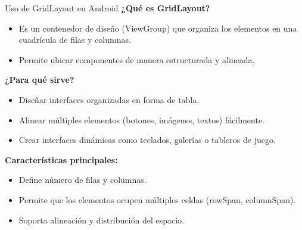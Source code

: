 \begin{frame}{Uso de GridLayout en Android}
\textbf{¿Qué es GridLayout?}

\begin{itemize}
    \item Es un contenedor de diseño (ViewGroup) que organiza los elementos en una cuadrícula de filas y columnas.
    \item Permite ubicar componentes de manera estructurada y alineada.
\end{itemize}

\vspace{0.4cm}

\textbf{¿Para qué sirve?}
\begin{itemize}
    \item Diseñar interfaces organizadas en forma de tabla.
    \item Alinear múltiples elementos (botones, imágenes, textos) fácilmente.
    \item Crear interfaces dinámicas como teclados, galerías o tableros de juego.
\end{itemize}

\vspace{0.4cm}

\textbf{Características principales:}
\begin{itemize}
    \item Define número de filas y columnas.
    \item Permite que los elementos ocupen múltiples celdas (rowSpan, columnSpan).
    \item Soporta alineación y distribución del espacio.
\end{itemize}


\end{frame}


